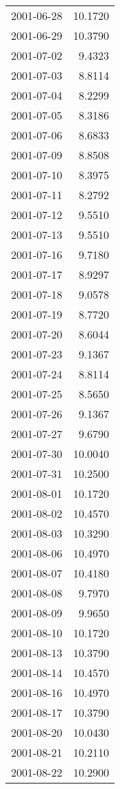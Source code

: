 \begin{tabular}{lr}
2001-06-28 &     10.1720 \\
2001-06-29 &     10.3790 \\
2001-07-02 &      9.4323 \\
2001-07-03 &      8.8114 \\
2001-07-04 &      8.2299 \\
2001-07-05 &      8.3186 \\
2001-07-06 &      8.6833 \\
2001-07-09 &      8.8508 \\
2001-07-10 &      8.3975 \\
2001-07-11 &      8.2792 \\
2001-07-12 &      9.5510 \\
2001-07-13 &      9.5510 \\
2001-07-16 &      9.7180 \\
2001-07-17 &      8.9297 \\
2001-07-18 &      9.0578 \\
2001-07-19 &      8.7720 \\
2001-07-20 &      8.6044 \\
2001-07-23 &      9.1367 \\
2001-07-24 &      8.8114 \\
2001-07-25 &      8.5650 \\
2001-07-26 &      9.1367 \\
2001-07-27 &      9.6790 \\
2001-07-30 &     10.0040 \\
2001-07-31 &     10.2500 \\
2001-08-01 &     10.1720 \\
2001-08-02 &     10.4570 \\
2001-08-03 &     10.3290 \\
2001-08-06 &     10.4970 \\
2001-08-07 &     10.4180 \\
2001-08-08 &      9.7970 \\
2001-08-09 &      9.9650 \\
2001-08-10 &     10.1720 \\
2001-08-13 &     10.3790 \\
2001-08-14 &     10.4570 \\
2001-08-16 &     10.4970 \\
2001-08-17 &     10.3790 \\
2001-08-20 &     10.0430 \\
2001-08-21 &     10.2110 \\
2001-08-22 &     10.2900 \\

\end{tabular}
